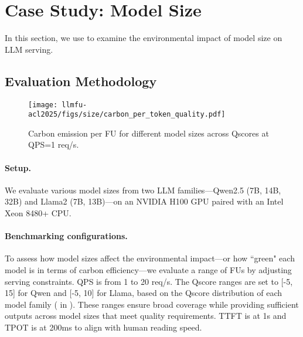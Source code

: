 \section{Case Study: Model Size}\label{sec:case1} 

In this section, we use \SYSTEM{} to examine the environmental impact of model size on LLM serving.


\subsection{Evaluation Methodology}

\begin{figure}[!t]
    \centering
    \texttt{[image: llmfu-acl2025/figs/size/carbon\_per\_token\_quality.pdf]}
    \vspace{-0.15in}
    \caption{Carbon emission per FU for different model sizes across Qscores at QPS=1 req/s.}
    \label{fig:size_carbon_per_token_quality}
\end{figure}

\paragraph{Setup.} We evaluate various model sizes from two LLM families---Qwen2.5 (7B, 14B, 32B) and Llama2 (7B, 13B)---on an NVIDIA H100 GPU paired with an Intel Xeon 8480+ CPU.

\paragraph{Benchmarking configurations.} To assess how model sizes affect the environmental impact---or how ``green" \textcolor{green!60!black}{\faPagelines} each model is in terms of carbon efficiency---we evaluate a range of FUs by adjusting serving constraints. QPS is from 1 to 20 req/s. The Qscore ranges are set to [-5, 15] for Qwen and [-5, 10] for Llama, based on the Qscore distribution of each model family ( in ). These ranges ensure broad coverage while providing sufficient outputs across model sizes that meet quality requirements. TTFT is at 1s and TPOT is at 200ms to align with human reading speed. 


